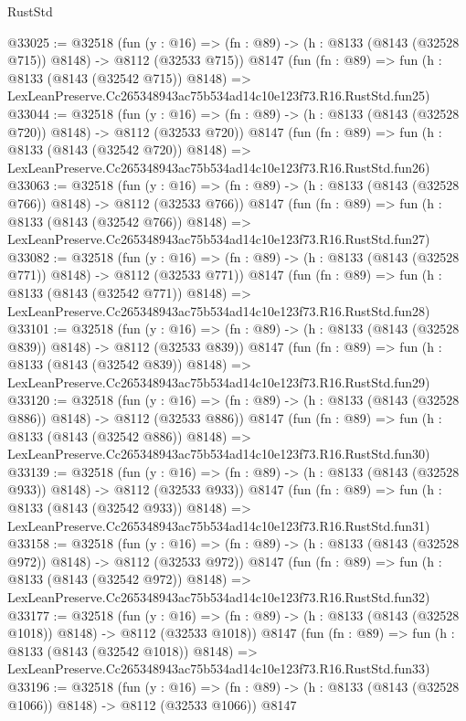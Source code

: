 \begin{lexlean}{RustStd}
\begin{coremodule}
@33025 := @32518
    (fun (y : @16) => (fn : @89) -> (h : @8133 (@8143 (@32528 @715)) @8148) -> @8112 (@32533 @715))
    @8147
    (fun (fn : @89) =>
    fun (h : @8133 (@8143 (@32542 @715)) @8148) =>
    LexLeanPreserve.Cc265348943ac75b534ad14c10e123f73.R16.RustStd.fun25)
@33044 := @32518
    (fun (y : @16) => (fn : @89) -> (h : @8133 (@8143 (@32528 @720)) @8148) -> @8112 (@32533 @720))
    @8147
    (fun (fn : @89) =>
    fun (h : @8133 (@8143 (@32542 @720)) @8148) =>
    LexLeanPreserve.Cc265348943ac75b534ad14c10e123f73.R16.RustStd.fun26)
@33063 := @32518
    (fun (y : @16) => (fn : @89) -> (h : @8133 (@8143 (@32528 @766)) @8148) -> @8112 (@32533 @766))
    @8147
    (fun (fn : @89) =>
    fun (h : @8133 (@8143 (@32542 @766)) @8148) =>
    LexLeanPreserve.Cc265348943ac75b534ad14c10e123f73.R16.RustStd.fun27)
@33082 := @32518
    (fun (y : @16) => (fn : @89) -> (h : @8133 (@8143 (@32528 @771)) @8148) -> @8112 (@32533 @771))
    @8147
    (fun (fn : @89) =>
    fun (h : @8133 (@8143 (@32542 @771)) @8148) =>
    LexLeanPreserve.Cc265348943ac75b534ad14c10e123f73.R16.RustStd.fun28)
@33101 := @32518
    (fun (y : @16) => (fn : @89) -> (h : @8133 (@8143 (@32528 @839)) @8148) -> @8112 (@32533 @839))
    @8147
    (fun (fn : @89) =>
    fun (h : @8133 (@8143 (@32542 @839)) @8148) =>
    LexLeanPreserve.Cc265348943ac75b534ad14c10e123f73.R16.RustStd.fun29)
@33120 := @32518
    (fun (y : @16) => (fn : @89) -> (h : @8133 (@8143 (@32528 @886)) @8148) -> @8112 (@32533 @886))
    @8147
    (fun (fn : @89) =>
    fun (h : @8133 (@8143 (@32542 @886)) @8148) =>
    LexLeanPreserve.Cc265348943ac75b534ad14c10e123f73.R16.RustStd.fun30)
@33139 := @32518
    (fun (y : @16) => (fn : @89) -> (h : @8133 (@8143 (@32528 @933)) @8148) -> @8112 (@32533 @933))
    @8147
    (fun (fn : @89) =>
    fun (h : @8133 (@8143 (@32542 @933)) @8148) =>
    LexLeanPreserve.Cc265348943ac75b534ad14c10e123f73.R16.RustStd.fun31)
@33158 := @32518
    (fun (y : @16) => (fn : @89) -> (h : @8133 (@8143 (@32528 @972)) @8148) -> @8112 (@32533 @972))
    @8147
    (fun (fn : @89) =>
    fun (h : @8133 (@8143 (@32542 @972)) @8148) =>
    LexLeanPreserve.Cc265348943ac75b534ad14c10e123f73.R16.RustStd.fun32)
@33177 := @32518
    (fun (y : @16) =>
    (fn : @89) -> (h : @8133 (@8143 (@32528 @1018)) @8148) -> @8112 (@32533 @1018))
    @8147
    (fun (fn : @89) =>
    fun (h : @8133 (@8143 (@32542 @1018)) @8148) =>
    LexLeanPreserve.Cc265348943ac75b534ad14c10e123f73.R16.RustStd.fun33)
@33196 := @32518
    (fun (y : @16) =>
    (fn : @89) -> (h : @8133 (@8143 (@32528 @1066)) @8148) -> @8112 (@32533 @1066))
    @8147

\end{coremodule}
\end{lexlean}
